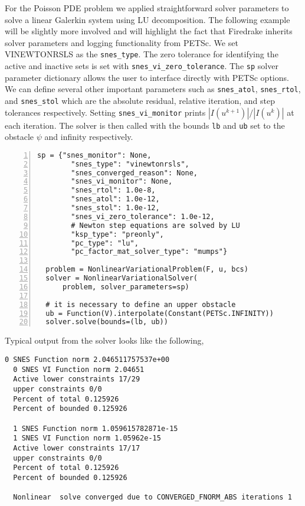 \documentclass[12 pt]{report}
\newcommand{\abs}[1]{\left| #1 \right|}
\begin{document}
For the Poisson PDE problem we applied straightforward solver parameters to solve a linear Galerkin system using LU decomposition. The following example will be slightly more involved and will highlight the fact that Firedrake inherits solver parameters and logging functionality from PETSc. We set VINEWTONRSLS as the \texttt{snes\_type}. The zero tolerance for identifying the active and inactive sets is set with \texttt{snes\_vi\_zero\_tolerance}. The \texttt{sp} solver parameter dictionary allows the user to interface directly with PETSc options. We can define several other important parameters such as \texttt{snes\_atol},  \texttt{snes\_rtol}, and \texttt{snes\_stol} which are the absolute residual, relative iteration, and step tolerances respectively. Setting \texttt{snes\_vi\_monitor} prints $\abs{I(u^{k + 1})}/\abs{I(u^k)}$ at each iteration. The solver is then called with the bounds \texttt{lb} and \texttt{ub} set to the obstacle $\psi$ and infinity respectively.
\begin{Verbatim}[frame = single,numbers = left,baselinestretch=0.75, firstnumber=last]
  sp = {"snes_monitor": None,         
        "snes_type": "vinewtonrsls",
        "snes_converged_reason": None, 
        "snes_vi_monitor": None,      
        "snes_rtol": 1.0e-8,
        "snes_atol": 1.0e-12,
        "snes_stol": 1.0e-12,
        "snes_vi_zero_tolerance": 1.0e-12,
        # Newton step equations are solved by LU
        "ksp_type": "preonly",
        "pc_type": "lu",
        "pc_factor_mat_solver_type": "mumps"}

  problem = NonlinearVariationalProblem(F, u, bcs)
  solver = NonlinearVariationalSolver(
      problem, solver_parameters=sp)

  # it is necessary to define an upper obstacle
  ub = Function(V).interpolate(Constant(PETSc.INFINITY))  
  solver.solve(bounds=(lb, ub))  
\end{Verbatim}

Typical output from the solver looks like the following, 
{\small
\begin{Verbatim}[baselinestretch=0.75]
  0 SNES Function norm 2.046511757537e+00
  0 SNES VI Function norm 2.04651 
  Active lower constraints 17/29 
  upper constraints 0/0 
  Percent of total 0.125926 
  Percent of bounded 0.125926
  
  1 SNES Function norm 1.059615782871e-15
  1 SNES VI Function norm 1.05962e-15 
  Active lower constraints 17/17 
  upper constraints 0/0
  Percent of total 0.125926 
  Percent of bounded 0.125926
  
  Nonlinear  solve converged due to CONVERGED_FNORM_ABS iterations 1
\end{Verbatim}
}
\end{document}
